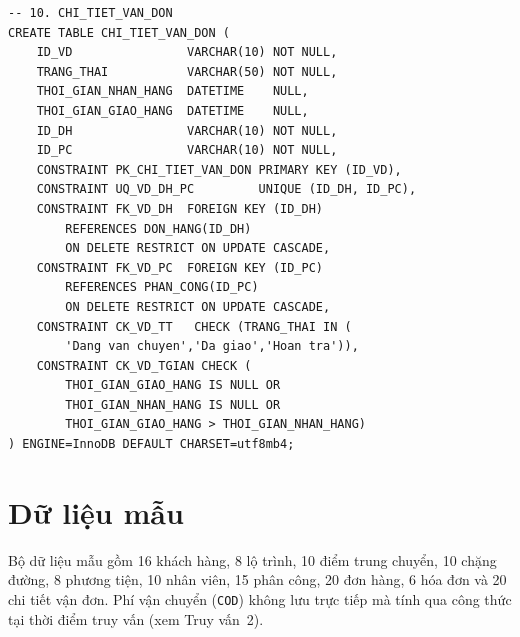 \documentclass[11pt]{report}
\begin{document}
\begin{verbatim}
-- 10. CHI_TIET_VAN_DON
CREATE TABLE CHI_TIET_VAN_DON (
    ID_VD                VARCHAR(10) NOT NULL,
    TRANG_THAI           VARCHAR(50) NOT NULL,
    THOI_GIAN_NHAN_HANG  DATETIME    NULL,
    THOI_GIAN_GIAO_HANG  DATETIME    NULL,
    ID_DH                VARCHAR(10) NOT NULL,
    ID_PC                VARCHAR(10) NOT NULL,
    CONSTRAINT PK_CHI_TIET_VAN_DON PRIMARY KEY (ID_VD),
    CONSTRAINT UQ_VD_DH_PC         UNIQUE (ID_DH, ID_PC),
    CONSTRAINT FK_VD_DH  FOREIGN KEY (ID_DH)
        REFERENCES DON_HANG(ID_DH)
        ON DELETE RESTRICT ON UPDATE CASCADE,
    CONSTRAINT FK_VD_PC  FOREIGN KEY (ID_PC)
        REFERENCES PHAN_CONG(ID_PC)
        ON DELETE RESTRICT ON UPDATE CASCADE,
    CONSTRAINT CK_VD_TT   CHECK (TRANG_THAI IN (
        'Dang van chuyen','Da giao','Hoan tra')),
    CONSTRAINT CK_VD_TGIAN CHECK (
        THOI_GIAN_GIAO_HANG IS NULL OR
        THOI_GIAN_NHAN_HANG IS NULL OR
        THOI_GIAN_GIAO_HANG > THOI_GIAN_NHAN_HANG)
) ENGINE=InnoDB DEFAULT CHARSET=utf8mb4;
\end{verbatim}

\section{Dữ liệu mẫu}

Bộ dữ liệu mẫu gồm 16 khách hàng, 8 lộ trình, 10 điểm trung chuyển, 10 chặng đường, 8 phương tiện, 10 nhân viên, 15 phân công, 20 đơn hàng, 6 hóa đơn và 20 chi tiết vận đơn. Phí vận chuyển (\texttt{COD}) không lưu trực tiếp mà tính qua công thức tại thời điểm truy vấn (xem Truy vấn~2).
\end{document}
